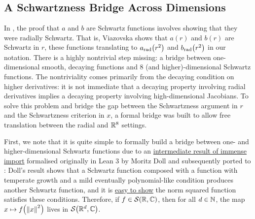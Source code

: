 \subsection{A Schwartzness Bridge Across Dimensions}
\label{Ch5:Subsec:Schwartz_Bridge}


In \cite{Viazovska8}, the proof that $a$ and $b$ are Schwartz functions involves showing that they were radially Schwartz. That is, Viazovska shows that $a(r)$ and $b(r)$ are Schwartz in $r$, these functions translating to $a_{\operatorname{rad}}\!\left( r^2 \right)$ and $b_{\operatorname{rad}}\!\left( r^2 \right)$ in our notation. There is a highly nontrivial step missing: a bridge between one-dimensional smooth, decaying functions and $8$ (and higher)-dimensional Schwartz functions. The nontriviality comes primarily from the decaying condition on higher derivatives: it is not immediate that a decaying property involving radial derivatives implies a decaying property involving high-dimensional Jacobians. To solve this problem and bridge the gap between the Schwartzness argument in $r$ and the Schwartzness criterion in $x$, a formal bridge was built to allow free translation between the radial and $\mathbb{R}^8$ settings.

First, we note that it is quite simple to formally build a bridge between one- and higher-dimensional Schwartz functions due to an \href{https://github.com/leanprover-community/mathlib4/blame/5a2eaa85c555c4263e15928cef249cbaad2eb2d2/Mathlib/Analysis/Distribution/SchwartzSpace.lean#L857}{intermediate result of immense import} formalised originally in Lean 3 by Moritz Doll and subsequently ported to : Doll's result shows that a Schwartz function composed with a function with temperate growth and a mild eventually polynomial-like condition produces another Schwartz function, and it is \href{https://github.com/thefundamentaltheor3m/Sphere-Packing-Lean/blob/704c085b1251cc0c208cc373f4e6105af359edd4/SpherePacking/ForMathlib/RadialSchwartz.lean#L38}{easy to show} the norm squared function satisfies these conditions. Therefore, if $f \in \mathcal{S}\!\left( \mathbb{R}, \mathbb{C} \right)$, then for all $d \in \mathbb{N}$, the map $x \mapsto f\!\left( \left\lVert x \right\rVert^2 \right)$ lives in $\mathcal{S}\!\left( \mathbb{R}^d, \mathbb{C} \right)$.

